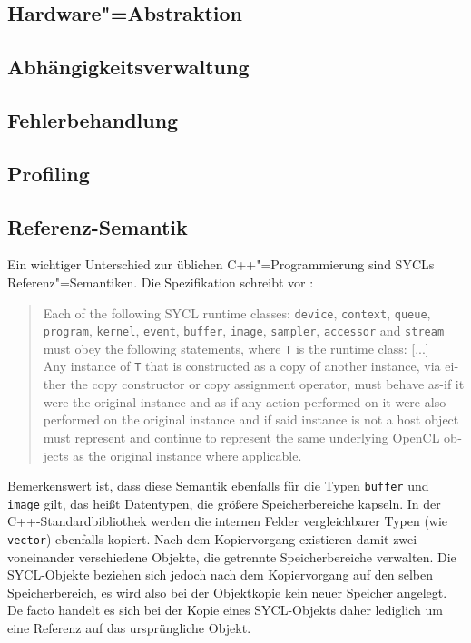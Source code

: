 \subsection{Hardware"=Abstraktion}

\subsection{Abhängigkeitsverwaltung}
\label{sycl:konzepte:abhaengigkeiten}

\subsection{Fehlerbehandlung}

\subsection{Profiling}

\subsection{Referenz-Semantik}

Ein wichtiger Unterschied zur üblichen C++"=Programmierung sind SYCLs
Referenz"=Semantiken. Die Spezifikation schreibt vor
\cite[siehe][Abschnitt 4.3.2]{sycl2019}:
\begin{otherlanguage}{english}
    \begin{quote}
        Each of the following SYCL runtime classes: \texttt{device},
        \texttt{context}, \texttt{queue}, \texttt{program}, \texttt{kernel},
        \texttt{event}, \texttt{buffer}, \texttt{image}, \texttt{sampler},
        \texttt{accessor} and \texttt{stream} must obey the following
        statements, where \texttt{T} is the runtime class: [...]
        \\
        Any instance of \texttt{T} that is constructed as a copy of another
        instance, via either the copy constructor or copy assignment operator,
        must behave as-if it were the original instance and as-if any action
        performed on it were also performed on the original instance and if said
        instance is not a host object must represent and continue to represent
        the same underlying OpenCL objects as the original instance where
        applicable.
    \end{quote}
\end{otherlanguage}
Bemerkenswert ist, dass diese Semantik ebenfalls für die Typen \texttt{buffer}
und \texttt{image} gilt, das heißt Datentypen, die größere Speicherbereiche
kapseln. In der C++-Standardbibliothek werden die internen Felder vergleichbarer
Typen (wie \texttt{vector}) ebenfalls kopiert. Nach dem Kopiervorgang existieren
damit zwei voneinander verschiedene Objekte, die getrennte Speicherbereiche
verwalten. Die SYCL-Objekte beziehen sich jedoch nach dem Kopiervorgang auf den
selben Speicherbereich, es wird also bei der Objektkopie kein neuer Speicher
angelegt. De facto handelt es sich bei der Kopie eines SYCL-Objekts daher
lediglich um eine Referenz auf das ursprüngliche Objekt.

